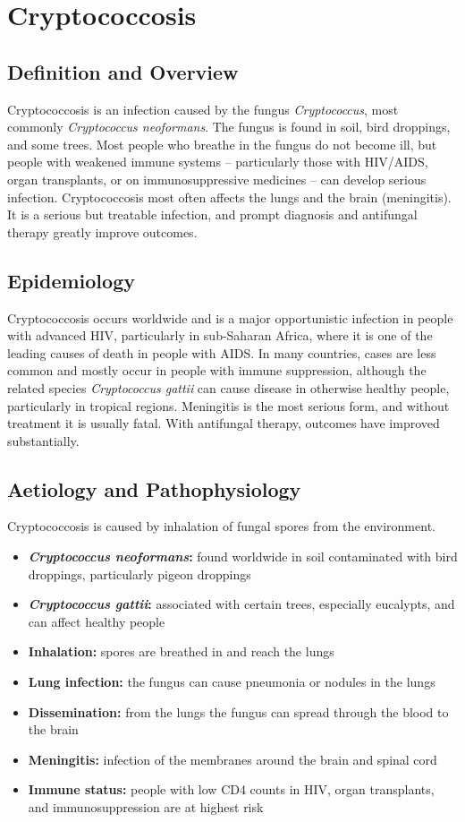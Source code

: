 \chapter{Cryptococcosis}

\section*{Definition and Overview}
Cryptococcosis is an infection caused by the fungus \textit{Cryptococcus}, most commonly \textit{Cryptococcus neoformans}. The fungus is found in soil, bird droppings, and some trees. Most people who breathe in the fungus do not become ill, but people with weakened immune systems -- particularly those with HIV/AIDS, organ transplants, or on immunosuppressive medicines -- can develop serious infection. Cryptococcosis most often affects the lungs and the brain (meningitis). It is a serious but treatable infection, and prompt diagnosis and antifungal therapy greatly improve outcomes.

\section*{Epidemiology}
Cryptococcosis occurs worldwide and is a major opportunistic infection in people with advanced HIV, particularly in sub-Saharan Africa, where it is one of the leading causes of death in people with AIDS. In many countries, cases are less common and mostly occur in people with immune suppression, although the related species \textit{Cryptococcus gattii} can cause disease in otherwise healthy people, particularly in tropical regions. Meningitis is the most serious form, and without treatment it is usually fatal. With antifungal therapy, outcomes have improved substantially.

\section*{Aetiology and Pathophysiology}
Cryptococcosis is caused by inhalation of fungal spores from the environment.

\begin{itemize}
    \item \textbf{\textit{Cryptococcus neoformans}:} found worldwide in soil contaminated with bird droppings, particularly pigeon droppings
    \item \textbf{\textit{Cryptococcus gattii}:} associated with certain trees, especially eucalypts, and can affect healthy people
    \item \textbf{Inhalation:} spores are breathed in and reach the lungs
    \item \textbf{Lung infection:} the fungus can cause pneumonia or nodules in the lungs
    \item \textbf{Dissemination:} from the lungs the fungus can spread through the blood to the brain
    \item \textbf{Meningitis:} infection of the membranes around the brain and spinal cord
    \item \textbf{Immune status:} people with low CD4 counts in HIV, organ transplants, and immunosuppression are at highest risk
\end{itemize}

